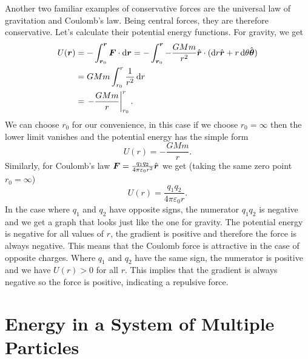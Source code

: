 \documentclass[../classical_mechanics.tex]{subfiles}
\begin{document}
            Another two familiar examples of conservative forces are the universal law of gravitation and Coulomb's law.
            Being central forces, they are therefore conservative.
            Let's calculate their potential energy functions.
            For gravity, we get
            \begin{align}
                U(\vec{r})&=-\int_{\vec{r}_0}^{\vec{r}}\vec{F}\cdot\dd{\vec{r}}=-\int_{\vec{r}_0}^{\vec{r}}-\frac{GMm}{r^2}\uvec{r}\cdot(\dd{r}\uvec{r}+r\dd{\theta}\uvec{\theta})\\
                &=GMm\int_{r_0}^{r}\frac{1}{r^2}\dd{r}\\
                &=\left.-\frac{GMm}{r}\right|_{r_0}^{r}.
            \end{align}
            We can choose $r_0$ for our convenience, in this case if we choose $r_0=\infty$ then the lower limit vanishes and the potential energy has the simple form
            \begin{equation}
                U(r)=-\frac{GMm}{r}.
            \end{equation}
            Similarly, for Coulomb's law $\boldsymbol{F}=\frac{q_1q_2}{4\pi\varepsilon_0r^2}\hat{\boldsymbol{r}}$ we get (taking the same zero point $r_0=\infty$)
            \begin{equation}
                U(r)=\frac{q_1q_2}{4\pi\varepsilon_0r}.
            \end{equation}
            In the case where $q_1$ and $q_2$ have opposite signs, the numerator $q_1q_2$ is negative and we get a graph that looks just like the one for gravity.
            The potential energy is negative for all values of $r$, the gradient is positive and therefore the force is always negative.
            This means that the Coulomb force is attractive in the case of opposite charges.
            Where $q_1$ and $q_2$ have the same sign, the numerator is positive and we have $U(r)>0$ for all $r$.
            This implies that the gradient is always negative so the force is positive, indicating a repulsive force.

    \section{Energy in a System of Multiple Particles}\label{sec:energy-in-a-system-of-multiple-particles}
\end{document}
